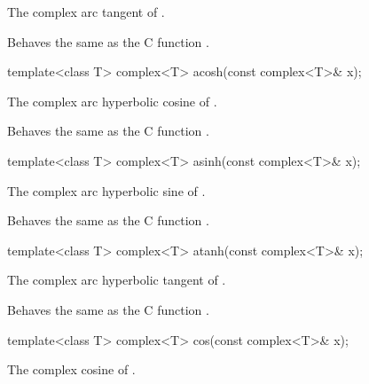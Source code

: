 \begin{itemdescr}
\pnum
\returns The complex arc tangent of .

\pnum
\remarks
Behaves the same as the C function .
\end{itemdescr}

%
%
\begin{itemdecl}
template<class T> complex<T> acosh(const complex<T>& x);
\end{itemdecl}

\begin{itemdescr}
\pnum
\returns The complex arc hyperbolic cosine of .

\pnum
\remarks
Behaves the same as the C function .
\end{itemdescr}

%
%
\begin{itemdecl}
template<class T> complex<T> asinh(const complex<T>& x);
\end{itemdecl}

\begin{itemdescr}
\pnum
\returns The complex arc hyperbolic sine of .

\pnum
\remarks
Behaves the same as the C function .
\end{itemdescr}

%
%
\begin{itemdecl}
template<class T> complex<T> atanh(const complex<T>& x);
\end{itemdecl}

\begin{itemdescr}
\pnum
\returns The complex arc hyperbolic tangent of .

\pnum
\remarks
Behaves the same as the C function .
\end{itemdescr}

%
\begin{itemdecl}
template<class T> complex<T> cos(const complex<T>& x);
\end{itemdecl}

\begin{itemdescr}
\pnum
\returns
The complex cosine of .
\end{itemdescr}

